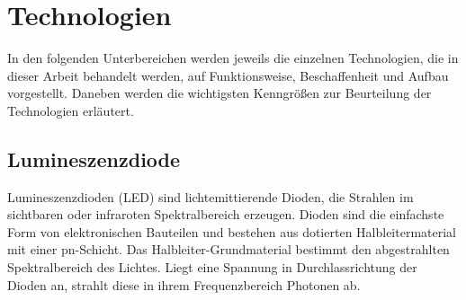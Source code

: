 \section{Technologien}
In den folgenden Unterbereichen werden jeweils die einzelnen Technologien, die in dieser Arbeit behandelt werden, auf Funktionsweise, Beschaffenheit und Aufbau vorgestellt. Daneben werden die wichtigsten Kenngrößen zur Beurteilung der Technologien erläutert.
\subsection{Lumineszenzdiode}
Lumineszenzdioden (LED) sind lichtemittierende Dioden, die Strahlen im sichtbaren oder infraroten Spektralbereich erzeugen. Dioden sind die einfachste Form von elektronischen Bauteilen und bestehen aus dotierten Halbleitermaterial mit einer pn-Schicht. Das Halbleiter-Grundmaterial bestimmt den abgestrahlten Spektralbereich des Lichtes. Liegt eine Spannung in Durchlassrichtung der Dioden an, strahlt diese in ihrem Frequenzbereich Photonen ab. \cite[Vgl. Seite 193 f.]{LofflerMang.2020} \\

